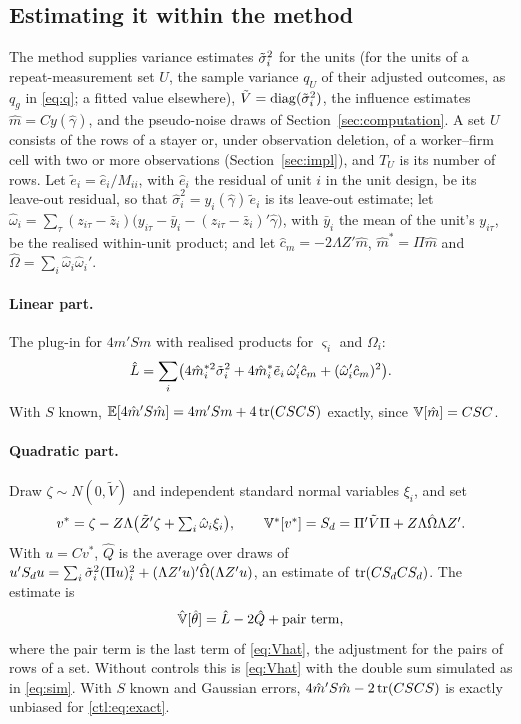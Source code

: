 \subsection{Estimating it within the method}\label{ctl:est}

The method supplies variance estimates $\tilde\sigma_i^2$ for the units (for the units of a repeat-measurement set $U$,
the sample variance $q_U$ of their adjusted outcomes, as $q_g$ in \eqref{eq:q}; a fitted value elsewhere),
$\tilde V=\operatorname{diag}(\tilde\sigma_i^2)$, the influence estimates $\hat m=Cy(\hat\gamma)$, and the pseudo-noise draws of
Section~\ref{sec:computation}. A set $U$ consists of the rows of a stayer or, under observation deletion, of a
worker--firm cell with two or more observations (Section~\ref{sec:impl}), and $T_U$ is its number of rows. Let
$\tilde e_i=\hat e_i/M_{ii}$, with $\hat e_i$ the residual of unit $i$ in the unit design, be its leave-out residual,
so that $\hat\sigma_i^2=y_i(\hat\gamma)\,\tilde e_i$ is its leave-out estimate; let
$\hat\omega_i=\sum_\tau(z_{i\tau}-\bar z_i)\bigl(y_{i\tau}-\bar y_i-(z_{i\tau}-\bar z_i)'\hat\gamma\bigr)$, with $\bar
y_i$ the mean of the unit's $y_{i\tau}$, be the realised within-unit product; and let $\hat c_m=-2\Lambda Z'\hat m$,
$\hat m^*=\Pi\hat m$ and $\hat\Omega=\sum_i\hat\omega_i\hat\omega_i'$.

\paragraph{Linear part.} The plug-in for $4m'Sm$ with realised products for $\varsigma_i$ and $\Omega_i$:
\begin{equation}\label{ctl:eq:Lhat}
 \hat L=\sum_i\bigl(4\hat m_i^{*2}\tilde\sigma_i^2+4\hat m_i^*\tilde e_i\,\hat\omega_i'\hat c_m+(\hat\omega_i'\hat c_m)^2\bigr).
\end{equation}
With $S$ known, $\mathbb{E}[4\hat m'S\hat m]=4m'Sm+4\operatorname{tr}(CSCS)$ exactly, since $\mathbb{V}[\hat m]=CSC$.

\paragraph{Quadratic part.} Draw $\zeta\sim N(0,\tilde V)$ and independent standard normal variables $\xi_i$,
and set
\begin{equation}\label{ctl:eq:draw}
 v^*=\zeta-Z\Lambda\bigl(\tilde Z'\zeta+\textstyle\sum_i\hat\omega_i\xi_i\bigr),\qquad
 \mathbb{V}^*[v^*]=S_d=\Pi'\tilde V\Pi+Z\Lambda\hat\Omega\Lambda Z' .
\end{equation}
With $u=Cv^*$, $\hat Q$ is the average over draws of $u'S_du=\sum_i\tilde\sigma_i^2(\Pi u)_i^2+
(\Lambda Z'u)'\hat\Omega(\Lambda Z'u)$, an estimate of $\operatorname{tr}(CS_dCS_d)$. The estimate is
\begin{equation}\label{ctl:eq:Vhat}
 \hat{\mathbb{V}}[\hat\theta]=\hat L-2\hat Q+\text{pair term},
\end{equation}
where the pair term is the last term of \eqref{eq:Vhat}, the adjustment for the pairs of rows of a set. Without
controls this is \eqref{eq:Vhat} with the double sum simulated as in \eqref{eq:sim}. With $S$ known and Gaussian
errors, $4\hat m'S\hat m-2\operatorname{tr}(CSCS)$ is exactly unbiased for \eqref{ctl:eq:exact}.

